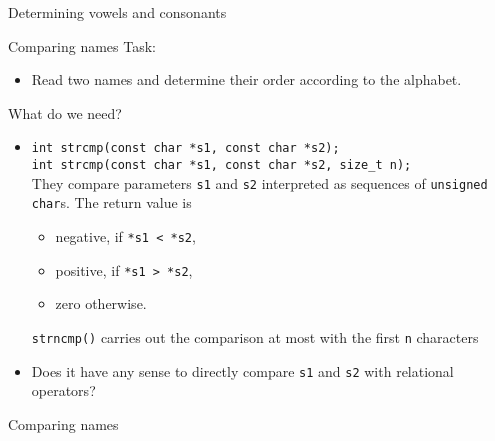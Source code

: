 \documentclass[usenames,dvipsnames,aspectratio=169]{beamer}
\begin{document}
\begin{frame}{Determining vowels and consonants}
  \begin{exampleblock}{}
    \scriptsize
    
  \end{exampleblock}
\end{frame}

\begin{frame}{Comparing names}
  Task:
  \begin{itemize}
    \item[] Read two names and determine their order according to the alphabet.
  \end{itemize}
  What do we need?
  \begin{itemize}
    \item \texttt{int strcmp(const char *s1, const char *s2);}\\
      \texttt{int strcmp(const char *s1, const char *s2, size\_t n);}\\
      They compare parameters \texttt{s1} and \texttt{s2} interpreted as sequences of \texttt{unsigned char}s. The return value is
      \begin{itemize}
        \scriptsize
        \item negative, if \texttt{*s1 < *s2},
        \item positive, if \texttt{*s1 > *s2},
        \item zero otherwise.
      \end{itemize}
      \texttt{strncmp()} carries out the comparison at most with the first \texttt{n} characters
    \item Does it have any sense to directly compare \texttt{s1} and \texttt{s2} with relational operators?
  \end{itemize}
\end{frame}

\begin{frame}{Comparing names}
  \begin{exampleblock}{}
    \scriptsize
    
  \end{exampleblock}
\end{frame}
\end{document}
